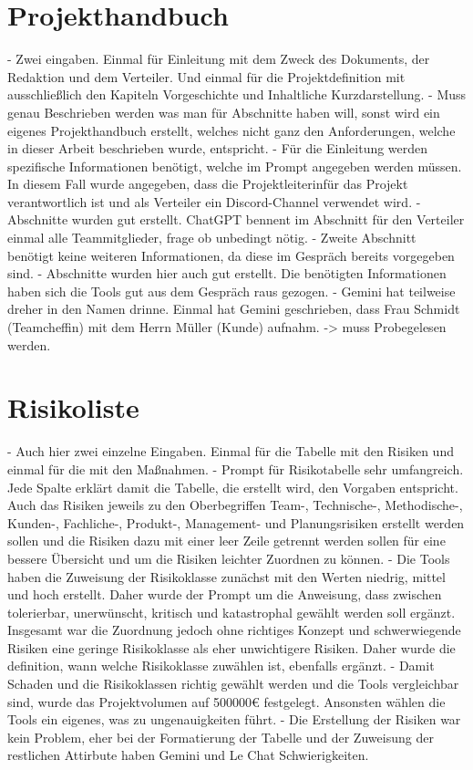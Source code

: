 \section{Projekthandbuch}  \label{CompProjekthandbuch}

- Zwei eingaben. Einmal für Einleitung mit dem Zweck des Dokuments, der Redaktion und dem Verteiler. Und einmal für die 
Projektdefinition mit ausschließlich den Kapiteln Vorgeschichte und Inhaltliche Kurzdarstellung.
- Muss genau Beschrieben werden was man für Abschnitte haben will, sonst wird ein eigenes Projekthandbuch erstellt, welches 
nicht ganz den Anforderungen, welche in dieser Arbeit beschrieben wurde, entspricht.
- Für die Einleitung werden spezifische Informationen benötigt, welche im Prompt angegeben werden müssen. In diesem Fall wurde 
angegeben, dass die Projektleiterinfür das Projekt verantwortlich ist und als Verteiler ein Discord-Channel verwendet wird.
- Abschnitte wurden gut erstellt. ChatGPT bennent im Abschnitt für den Verteiler einmal alle Teammitglieder, frage ob unbedingt nötig.
- Zweite Abschnitt benötigt keine weiteren Informationen, da diese im Gespräch bereits vorgegeben sind. 
- Abschnitte wurden hier auch gut erstellt. Die benötigten Informationen haben sich die Tools gut aus dem Gespräch raus gezogen.
- Gemini hat teilweise dreher in den Namen drinne. Einmal hat Gemini geschrieben, dass Frau Schmidt (Teamcheffin) mit dem Herrn Müller 
(Kunde) aufnahm. -> muss Probegelesen werden.

\section{Risikoliste}  \label{CompRisikoliste}

- Auch hier zwei einzelne Eingaben. Einmal für die Tabelle mit den Risiken und einmal für die mit den Maßnahmen.
- Prompt für Risikotabelle sehr umfangreich. Jede Spalte erklärt damit die Tabelle, die erstellt wird, den Vorgaben entspricht. 
Auch das Risiken jeweils zu den Oberbegriffen Team-, Technische-, Methodische-, Kunden-, Fachliche-, Produkt-, Management- und 
Planungsrisiken erstellt werden sollen und die Risiken dazu mit einer leer Zeile getrennt werden sollen für eine bessere Übersicht 
und um die Risiken leichter Zuordnen zu können.
- Die Tools haben die Zuweisung der Risikoklasse zunächst mit den Werten niedrig, mittel und hoch erstellt. Daher wurde der 
Prompt um die Anweisung, dass zwischen tolerierbar, unerwünscht, kritisch und katastrophal gewählt werden soll ergänzt.
Insgesamt war die Zuordnung jedoch ohne richtiges Konzept und schwerwiegende Risiken eine geringe Risikoklasse als eher unwichtigere
Risiken. Daher wurde die definition, wann welche Risikoklasse zuwählen ist, ebenfalls ergänzt.
- Damit Schaden und die Risikoklassen richtig gewählt werden und die Tools vergleichbar sind, wurde das Projektvolumen auf 500000€
festgelegt. Ansonsten wählen die Tools ein eigenes, was zu ungenauigkeiten führt.
- Die Erstellung der Risiken war kein Problem, eher bei der Formatierung der Tabelle und der Zuweisung der restlichen Attirbute haben
Gemini und Le Chat Schwierigkeiten.

